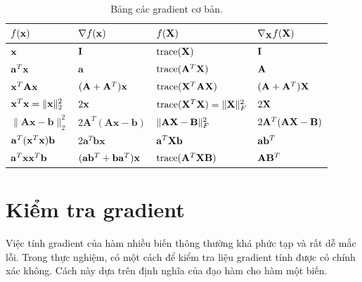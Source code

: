 \begin{table}
\centering
\caption{Bảng các gradient cơ bản.}
\label{tab:commongr}
\setlength{\tabcolsep}{0.5em}
{\normalsize {}
\begin{tabular}{|l|l||l|l|}
\hline
$f(\mathbf{x}) $                         & $ \nabla f(\mathbf{x}) $                                         & $f(\mathbf{X})$ & $\nabla_{\mathbf{X}} f(\mathbf{X})$\\ \hline
\hline
$ \mathbf{x} $ & $\mathbf{I}$ & $\text{trace}(\mathbf{X})$ &$ \mathbf{I}$ \\ \hline
$\mathbf{a}^T \mathbf{x} $               & $\mathbf{a}$                                              & $\text{trace}(\mathbf{A}^T\mathbf{X})$         & $\mathbf{A}$ \\ \hline
$\mathbf{x}^T\mathbf{Ax}$                & $(\mathbf{A} + \mathbf{A}^T) \mathbf{x}$                         &  $\text{trace}(\mathbf{X}^T\mathbf{A}\mathbf{X})$        & $(\mathbf{A} + \mathbf{A}^T) \mathbf{X}$ \\ \hline
$\mathbf{x}^T \mathbf{x} = \|\mathbf{x}\|_2^2 $        & $2\mathbf{x}$                                                    &  $\text{trace}(\mathbf{X}^T\mathbf{X}) = \|\mathbf{X}\|_F^2$        & $2\mathbf{X}$\\ \hline
$ \|\mathbf{Ax-b} \|_2^2 $        & $ 2\mathbf{A}^T (\mathbf{Ax - b})$                        &  $\|\mathbf{A}\mathbf{X} - \mathbf{B} \|_F^2$        & $2\mathbf{A}^T(\mathbf{A}\mathbf{X} - \mathbf{B})$ \\ \hline
$\mathbf{a}^T(\mathbf{x}^T\mathbf{x})\mathbf{b} $   & $2\mathbf{a}^T\mathbf{bx} $                               &  $\mathbf{a}^T\mathbf{X}\mathbf{b}$        & $\mathbf{a}\mathbf{b}^T$ \\ \hline
$\mathbf{a}^T\mathbf{x}\mathbf{x}^T\mathbf{b} $ & $ (\mathbf{a}\mathbf{b}^T + \mathbf{b}\mathbf{a}^T) \mathbf{x} $ &  $\text{trace}(\mathbf{A}^T\mathbf{X}\mathbf{B})$        & $\mathbf{A}\mathbf{B}^T$\\ \hline
\end{tabular}}
\end{table}

\section{Kiểm tra gradient}
\label{sec:check_grad}

Việc tính gradient của hàm nhiều biến thông thường khá phức tạp và rất dễ mắc
lỗi. Trong thực nghiệm, có một cách để kiểm tra liệu gradient tính được có chính
xác không. Cách này dựa trên định nghĩa của đạo hàm cho hàm một biến.

